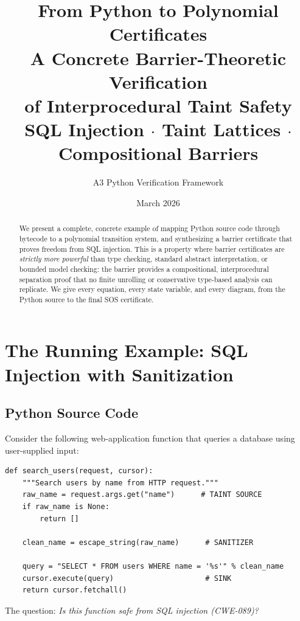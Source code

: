 \documentclass[11pt,a4paper]{article}
\title{%
  \textbf{From Python to Polynomial Certificates} \\[0.4em]
  \Large A Concrete Barrier-Theoretic Verification \\
  of Interprocedural Taint Safety \\[0.5em]
  \large SQL Injection $\cdot$ Taint Lattices $\cdot$ Compositional Barriers
}
\author{A3 Python Verification Framework}
\date{March 2026}
\theoremstyle{plain}
\theoremstyle{definition}
\theoremstyle{remark}
\begin{document}
\maketitle

\begin{abstract}
We present a complete, concrete example of mapping Python source code
through bytecode to a polynomial transition system, and synthesizing a
barrier certificate that proves freedom from SQL injection.  This is a
property where barrier certificates are \emph{strictly more powerful}
than type checking, standard abstract interpretation, or bounded model
checking: the barrier provides a compositional, interprocedural
separation proof that no finite unrolling or conservative
type-based analysis can replicate.  We give every equation, every
state variable, and every diagram, from the Python source to the final
SOS certificate.
\end{abstract}

\tableofcontents
\newpage

\section{The Running Example: SQL Injection with Sanitization}
\label{sec:example}

\subsection{Python Source Code}

Consider the following web-application function that queries a database
using user-supplied input:

\begin{lstlisting}[style=python, caption={Target Python function}, label=lst:target]
def search_users(request, cursor):
    """Search users by name from HTTP request."""
    raw_name = request.args.get("name")      # TAINT SOURCE
    if raw_name is None:
        return []

    clean_name = escape_string(raw_name)      # SANITIZER

    query = "SELECT * FROM users WHERE name = '%s'" % clean_name
    cursor.execute(query)                     # SINK
    return cursor.fetchall()
\end{lstlisting}

\noindent
The question: \emph{Is this function safe from SQL injection (CWE-089)?}
\end{document}
